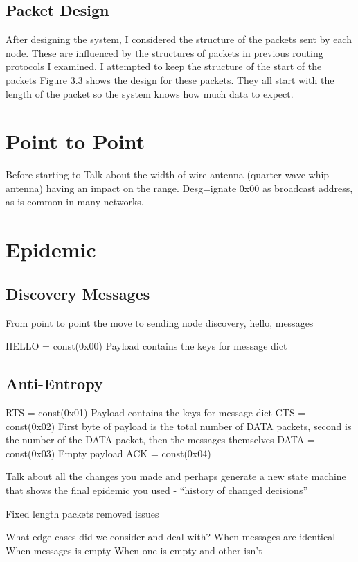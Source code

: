 \documentclass[12pt,a4paper]{report}
\begin{document}
\subsection{Packet Design}
After designing the system, I considered the structure of the packets sent by each node. These are  influenced by the structures of packets in previous routing protocols I examined. I attempted to keep the structure of the start of the packets  Figure 3.3 shows the design for these packets. They all start with the length of the packet so the system knows how much data to expect. 


\section{Point to Point}
Before starting to 
Talk about the width of wire antenna (quarter wave whip antenna) having an impact on the range. 
Desg=ignate 0x00 as broadcast address, as is common in many networks. 

\section{Epidemic}
\subsection{Discovery Messages}
From point to point the move to sending node discovery, hello, messages 

HELLO = const(0x00)
Payload contains the keys for message dict


\subsection{Anti-Entropy}
RTS = const(0x01)
 Payload contains the keys for message dict
CTS = const(0x02)
 First byte of payload is the total number of DATA packets, second is the number of the DATA packet, then the messages themselves
DATA = const(0x03)
 Empty payload
ACK = const(0x04)


Talk about all the changes you made and perhaps generate a new state machine that shows the final epidemic you used - ``history of changed decisions''

Fixed length packets removed issues 


What edge cases did we consider and deal with? When messages are identical 
When messages is empty 
When one is empty and other isn't
\end{document}
